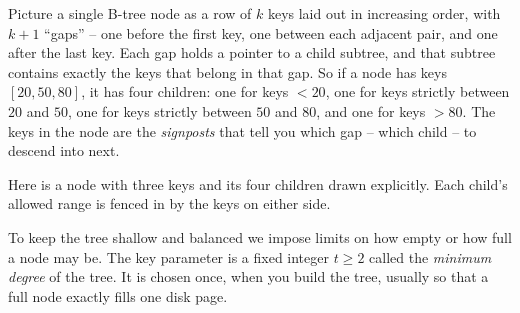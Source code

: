 \begin{intuitionbox}
Picture a single B-tree node as a row of $k$ keys laid out in increasing order,
with $k+1$ ``gaps'' -- one before the first key, one between each adjacent pair,
and one after the last key. Each gap holds a pointer to a child subtree, and that
subtree contains exactly the keys that belong in that gap. So if a node has keys
$[20, 50, 80]$, it has four children: one for keys $< 20$, one for keys strictly
between $20$ and $50$, one for keys strictly between $50$ and $80$, and one for
keys $> 80$. The keys in the node are the \emph{signposts} that tell you which gap
-- which child -- to descend into next.
\end{intuitionbox}

Here is a node with three keys and its four children drawn explicitly. Each child's allowed range is fenced in by the keys on either side.

\begin{center}
\end{center}

To keep the tree shallow and balanced we impose limits on how empty or how full a
node may be. The key parameter is a fixed integer $t \ge 2$ called the
\emph{minimum degree} of the tree. It is chosen once, when you build the tree,
usually so that a full node exactly fills one disk page.

